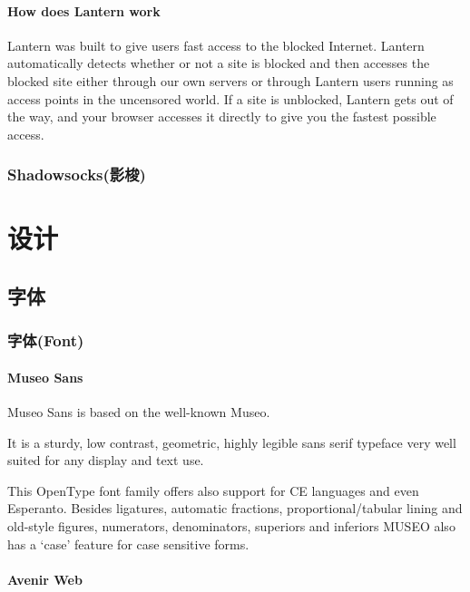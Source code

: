 \documentclass{book}
\begin{document}
\subsection{How does Lantern work}

Lantern was built to give users fast access to the blocked Internet. 
Lantern automatically detects whether or not a site is blocked 
and then accesses the blocked site either through our own servers 
or through Lantern users running as access points in the uncensored world. 
If a site is unblocked, Lantern gets out of the way, 
and your browser accesses it directly to give you the fastest possible access.

\section{Shadowsocks(影梭)}

\clearpage

\part{设计}

\chapter{字体}

\section{字体(Font)}

\subsection{Museo Sans}

Museo Sans is based on the well-known Museo.

It is a sturdy, low contrast, geometric, highly legible sans serif typeface very well suited for any display and text use.

This OpenType font family offers also support for CE languages and even Esperanto. Besides ligatures, automatic fractions, proportional/tabular lining and old-style figures, numerators, denominators, superiors and inferiors MUSEO also has a ‘case’ feature for case sensitive forms.

\subsection{Avenir Web}
\end{document}
